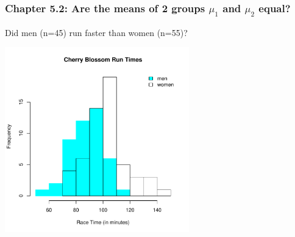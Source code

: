 \documentclass[slides]{beamer}
\begin{document}
%
%
\begin{frame}[fragile]
\frametitle{Chapter 5.2: Are the means of 2 groups $\mu_1$ and $\mu_2$ equal?}

Did men (n=45) run faster than women (n=55)?
\pause\begin{center}
\includegraphics[width=0.6\textwidth]{figure/race.pdf}
\end{center}

\end{frame}
\end{document}
